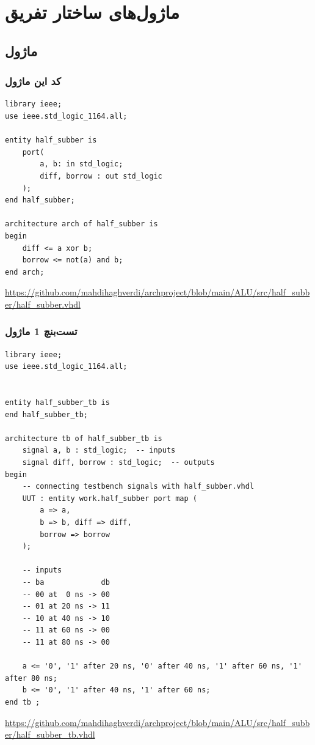 \documentclass[dvipsnames, svgnames, x11names, a4paper, 11pt, oneside]{book}
\begin{document}
		\clearpage
		\chapter{ماژول‌های ساختار تفریق}
			\section{ماژول }
				\subsection{کد این ماژول}
				
					\begin{latin}
						\begin{lstlisting}
library ieee;
use ieee.std_logic_1164.all;

entity half_subber is
	port(
		a, b: in std_logic;
		diff, borrow : out std_logic
	);
end half_subber;

architecture arch of half_subber is
begin
	diff <= a xor b;
	borrow <= not(a) and b;
end arch;			
						\end{lstlisting}
\url{https://github.com/mahdihaghverdi/archproject/blob/main/ALU/src/half_subber/half_subber.vhdl}
					\end{latin}
				\subsection{تست‌بنچ 1 ماژول}
				
					\begin{latin}
						
						\begin{lstlisting}
library ieee;
use ieee.std_logic_1164.all;


entity half_subber_tb is
end half_subber_tb;

architecture tb of half_subber_tb is
	signal a, b : std_logic;  -- inputs
	signal diff, borrow : std_logic;  -- outputs
begin
	-- connecting testbench signals with half_subber.vhdl
	UUT : entity work.half_subber port map (
		a => a,
		b => b, diff => diff,
		borrow => borrow
	);
	
	-- inputs
	-- ba             db
	-- 00 at  0 ns -> 00
	-- 01 at 20 ns -> 11
	-- 10 at 40 ns -> 10
	-- 11 at 60 ns -> 00
	-- 11 at 80 ns -> 00
	
	a <= '0', '1' after 20 ns, '0' after 40 ns, '1' after 60 ns, '1' after 80 ns;
	b <= '0', '1' after 40 ns, '1' after 60 ns;
end tb ;
						\end{lstlisting}
						\url{https://github.com/mahdihaghverdi/archproject/blob/main/ALU/src/half_subber/half_subber_tb.vhdl}
					\end{latin}
				
\end{document}
